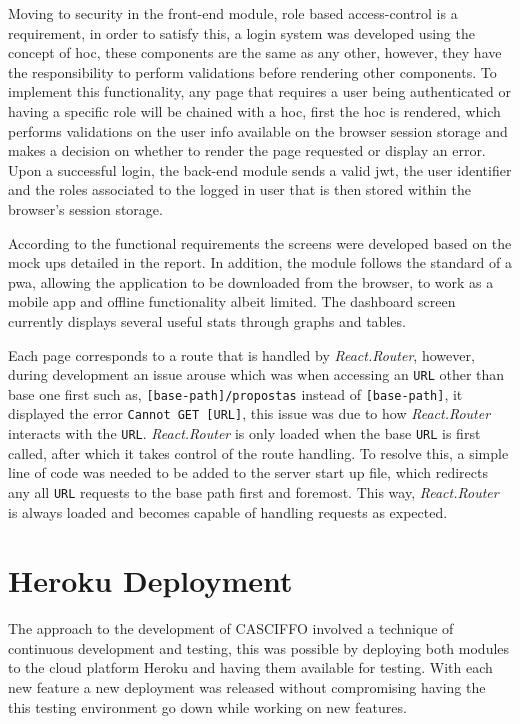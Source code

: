 Moving to security in the front-end module, role based access-control is a requirement, in order to satisfy this, a login system was developed using the concept of \acrfull{hoc}, these components are the same as any other, however, they have the responsibility to perform validations before rendering other components. To implement this functionality, any page that requires a user being authenticated or having a specific role will be chained with a \acrshort{hoc}, first the \acrshort{hoc} is rendered, which performs validations on the user info available on the browser session storage and makes a decision on whether to render the page requested or display an error.
Upon a successful login, the back-end module sends a valid \acrshort{jwt}, the user identifier and the roles associated to the logged in user that is then stored within the browser's session storage.

According to the functional requirements the screens were developed based on the mock ups detailed in the report. In addition, the module follows the standard of a \acrfull{pwa}, allowing the application to be downloaded from the browser, to work as a mobile app and offline functionality albeit limited. The dashboard screen currently displays several useful stats through graphs and tables.

Each page corresponds to a route that is handled by \textit{React.Router}, however, during development an issue arouse which was when accessing an \texttt{URL} other than base one first such as, \texttt{[base-path]/propostas} instead of \texttt{[base-path]}, it displayed the error \texttt{Cannot GET [URL]}, this issue was due to how \textit{React.Router} interacts with the \texttt{URL}.
\textit{React.Router} is only loaded when the base \texttt{URL} is first called, after which it takes control of the route handling. To resolve this, a simple line of code was needed to be added to the server start up file, which redirects any all \texttt{URL} requests to the base path first and foremost. This way, \textit{React.Router} is always loaded and becomes capable of handling requests as expected.


\section{Heroku Deployment}

The approach to the development of CASCIFFO involved a technique of continuous development and testing, this was possible by deploying both modules to the cloud platform Heroku and having them available for testing. With each new feature a new deployment was released without compromising having the this testing environment go down while working on new features. 

